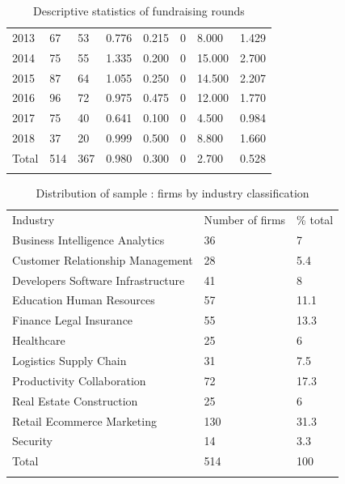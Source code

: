 \documentclass[12pt]{article}
\begin{document}
\begin{table} [ht]
\begin{tabular}{p{3.2cm} p{1.2cm} p{1.2cm} p{1.2cm} p{1.2cm} p{1.2cm} p{1.2cm} p{1.2cm}}
2013 & 67 & 53 & 0.776 & 0.215 & 0 & 8.000 & 1.429 \\
2014 & 75 & 55 & 1.335 & 0.200 & 0 & 15.000 & 2.700 \\
2015 & 87 & 64 & 1.055 & 0.250 & 0 & 14.500 & 2.207 \\
2016 & 96 & 72 & 0.975 & 0.475 & 0 & 12.000 & 1.770 \\
2017 & 75 & 40 & 0.641 & 0.100 & 0 & 4.500 & 0.984 \\
2018 & 37 & 20 & 0.999 & 0.500 & 0 & 8.800 & 1.660 \\
\cmidrule(l){2-8}
Total & 514 & 367 & 0.980 & 0.300 & 0 & 2.700 & 0.528 \\
 & & \\
\end{tabular}
\caption{Descriptive statistics of fundraising rounds}
\label{table3}
\end{table}

\begin{table} [ht]
\begin{spacing}{0.75}
\scriptsize
\renewcommand{\arraystretch}{1.5}
\begin{tabularx}{\textwidth}{ p{10cm} p{1.5cm} p{1.5cm} }
\toprule
\multicolumn{1}{l}{Industry}&\multicolumn{1}{l}{Number of firms}&\multicolumn{1}{l}{\% total}\\
\cmidrule(r){2-3}
Business Intelligence Analytics & 36 & 7 \\
Customer Relationship Management & 28 & 5.4 \\
Developers Software Infrastructure & 41 & 8 \\
Education Human Resources & 57 & 11.1 \\
Finance Legal Insurance & 55 & 13.3 \\
Healthcare & 25 & 6 \\
Logistics Supply Chain & 31 & 7.5 \\
Productivity Collaboration & 72 & 17.3 \\
Real Estate Construction & 25 & 6 \\
Retail Ecommerce Marketing & 130 & 31.3 \\
Security & 14 & 3.3 \\
\cmidrule(r){2-3}
Total & 514 & 100 \\
 & & \\
\end{tabularx}
\label{table4}
\caption{Distribution of sample : firms by industry classification}
\end{spacing}
\end{table}
\end{document}
